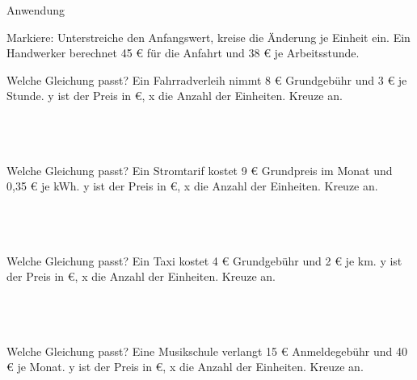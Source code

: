 \setcounter{aufgabe}{27}

\begin{aufgabe}{Anwendung}
\begin{teile}
\teil Markiere: Unterstreiche den Anfangswert, kreise die Änderung je Einheit ein. Ein Handwerker berechnet 45 € für die Anfahrt und 38 € je Arbeitsstunde.
\end{teile}
\begin{teile}
\teil Welche Gleichung passt? Ein Fahrradverleih nimmt 8 € Grundgebühr und 3 € je Stunde. y ist der Preis in €, x die Anzahl der Einheiten. Kreuze an. \\  \\  \\  \\ 
\end{teile}
\begin{teile}
\teil Welche Gleichung passt? Ein Stromtarif kostet 9 € Grundpreis im Monat und 0{,}35 € je kWh. y ist der Preis in €, x die Anzahl der Einheiten. Kreuze an. \\  \\  \\  \\ 
\end{teile}
\begin{teile}
\teil Welche Gleichung passt? Ein Taxi kostet 4 € Grundgebühr und 2 € je km. y ist der Preis in €, x die Anzahl der Einheiten. Kreuze an. \\  \\  \\  \\ 
\end{teile}
\begin{teile}
\teil Welche Gleichung passt? Eine Musikschule verlangt 15 € Anmeldegebühr und 40 € je Monat. y ist der Preis in €, x die Anzahl der Einheiten. Kreuze an. \\  \\  \\  \\ 

\end{teile}
\end{aufgabe}
